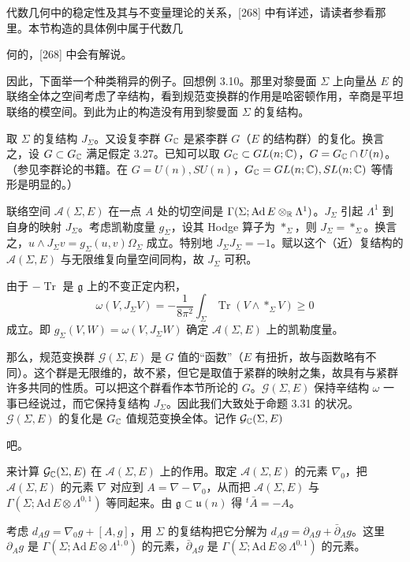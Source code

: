代数几何中的稳定性及其与不变量理论的关系，[268] 中有详述，请读者参看那里。本节构造的具体例中属于代数几

何的，[268] 中会有解说。

因此，下面举一个种类稍异的例子。回想例 3.10。那里对黎曼面 $\Sigma$ 上向量丛 $E$ 的联络全体之空间考虑了辛结构，看到规范变换群的作用是哈密顿作用，辛商是平坦联络的模空间。到此为止的构造没有用到黎曼面 $\Sigma$ 的复结构。

取 $\Sigma$ 的复结构 $J_\Sigma$。又设复李群 $G_{\mathbb{C}}$ 是紧李群 $G$（$E$ 的结构群）的复化。换言之，设 $G\subset G_{\mathbb{C}}$ 满足假定 3.27。已知可以取 $G_{\mathbb{C}}\subset GL(n;\mathbb{C})$，$G=G_{\mathbb{C}}\cap U(n)$。（参见李群论的书籍。在 $G=U(n),SU(n)$，$G_{\mathbb{C}}=GL(n;\mathbb{C}),SL(n;\mathbb{C})$ 等情形是明显的。）

联络空间 $\mathcal{A}(\Sigma,E)$ 在一点 $A$ 处的切空间是 $\Gamma(\Sigma;\mathrm{Ad}\,E\otimes_{\mathbb{R}}\Lambda^1)$。$J_\Sigma$ 引起 $\Lambda^1$ 到自身的映射 $J_\Sigma$。考虑凯勒度量 $g_\Sigma$，设其 Hodge 算子为 $*_\Sigma$，则 $J_\Sigma=*_\Sigma$。换言之，$u\wedge J_\Sigma v=g_\Sigma(u,v)\Omega_\Sigma$ 成立。特别地 $J_\Sigma J_\Sigma=-1$。赋以这个（近）复结构的 $\mathcal{A}(\Sigma,E)$ 与无限维复向量空间同构，故 $J_\Sigma$ 可积。

由于 $-\operatorname{Tr}$ 是 $\mathfrak{g}$ 上的不变正定内积，
\[
  \omega(V,J_\Sigma V)=-\frac{1}{8\pi^2}\int_\Sigma\operatorname{Tr}(V\wedge*_\Sigma V)\ge0
\]
成立。即 $g_\Sigma(V,W)=\omega(V,J_\Sigma W)$ 确定 $\mathcal{A}(\Sigma,E)$ 上的凯勒度量。

那么，规范变换群 $\mathcal{G}(\Sigma,E)$ 是 $G$ 值的“函数”（$E$ 有扭折，故与函数略有不同）。这个群是无限维的，故不紧，但它是取值于紧群的映射之集，故具有与紧群许多共同的性质。可以把这个群看作本节所论的 $G$。$\mathcal{G}(\Sigma,E)$ 保持辛结构 $\omega$ 一事已经说过，而它保持复结构 $J_\Sigma$。因此我们大致处于命题 3.31 的状况。$\mathcal{G}(\Sigma,E)$ 的复化是 $G_{\mathbb{C}}$ 值规范变换全体。记作 $\mathcal{G}_{\mathbb{C}}(\Sigma,E)$

吧。

来计算 $\mathcal{G}_{\mathbb{C}}(\Sigma,E)$ 在 $\mathcal{A}(\Sigma,E)$ 上的作用。取定 $\mathcal{A}(\Sigma,E)$ 的元素 $\nabla_0$，把 $\mathcal{A}(\Sigma,E)$ 的元素 $\nabla$ 对应到 $A=\nabla-\nabla_0$，从而把 $\mathcal{A}(\Sigma,E)$ 与 $\Gamma(\Sigma;\mathrm{Ad}\,E\otimes\Lambda^{0,1})$ 等同起来。由 $\mathfrak{g}\subset\mathfrak{u}(n)$ 得 ${}^t\bar A=-A$。

考虑 $d_Ag=\nabla_0g+[A,g]$，用 $\Sigma$ 的复结构把它分解为 $d_Ag=\partial_Ag+\bar\partial_Ag$。这里 $\partial_Ag$ 是 $\Gamma(\Sigma;\mathrm{Ad}\,E\otimes\Lambda^{1,0})$ 的元素，$\bar\partial_Ag$ 是 $\Gamma(\Sigma;\mathrm{Ad}\,E\otimes\Lambda^{0,1})$ 的元素。

